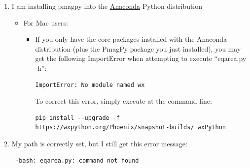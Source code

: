 \documentclass[11pt]{book}
\begin{document}
{{\begin{enumerate}
\begin{itemize}
\begin{verbatim}
pip list
\end{verbatim}

You should see both pmagpy-(version_number) and pmagpy-cli-(version_number) on that list.  If you don't see them, go ahead and reinstall:

\begin{verbatim}
pip install --upgrade --force-reinstall --no-cache-dir --no-deps pmagpy
pip install --upgrade --force-reinstall --no-cache-dir --no-deps pmagpy-cli
\end{verbatim}

Second, if you are trying to get a developer install to work on Windows, and you want to set/check your \$PATH manually, see \href{http://www.mathworks.com/matlabcentral/answers/94933-how-do-i-set-my-system-path-under-windows}{Setting your Path in Windows}.



\end {itemize}

\item I am installing pmagpy into the \href{https://www.continuum.io/downloads}{Anaconda} Python distribution

\begin{itemize}
\item For Mac users:
\begin{itemize}
\item If you only have the core packages installed with the Anaconda distribution (plus the PmagPy package you just installed), you may get the following ImportError when attempting to execute ``eqarea.py -h'':

\begin{verbatim}
ImportError: No module named wx
\end{verbatim}

To correct this error, simply execute at the command line:
\begin{verbatim}
pip install --upgrade -f https://wxpython.org/Phoenix/snapshot-builds/ wxPython
\end{verbatim}
\end{itemize}
\end{itemize}

\item  My path is correctly set, but I still get this error message: \begin{verbatim} -bash: eqarea.py: command not found
\end{verbatim}


\end{enumerate}}}
\end{document}
